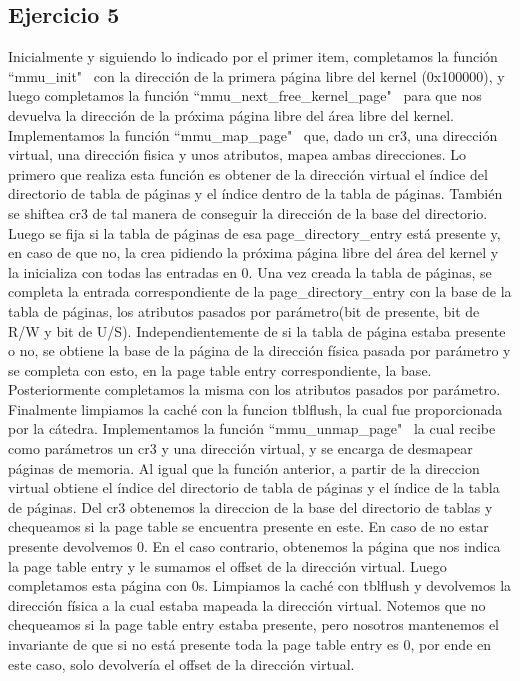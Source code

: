 \documentclass[a4paper]{article}
\begin{document}
\subsection{Ejercicio 5}
\justify
Inicialmente y siguiendo lo indicado por el primer item, completamos la función ``mmu_init" \ con la dirección de la primera página libre del kernel (0x100000), y luego completamos la función ``mmu_next_free_kernel_page" \ para que nos devuelva la dirección de la próxima página libre del área libre del kernel.
\justify
Implementamos la función ``mmu_map_page" \ que, dado un cr3, una dirección virtual, una dirección fisica y unos atributos, mapea ambas direcciones. Lo primero que realiza esta función es obtener de la dirección virtual el índice del directorio de tabla de páginas y el índice dentro de la tabla de páginas. También se shiftea cr3 de tal manera de conseguir la dirección de la base del directorio. Luego se fija si la tabla de páginas de esa page_directory_entry está presente y, en caso de que no, la crea pidiendo la próxima página libre del área del kernel y la inicializa con todas las entradas en 0. Una vez creada la tabla de páginas, se completa la entrada correspondiente de la page_directory_entry con la base de la tabla de páginas, los atributos pasados por parámetro(bit de presente, bit de R/W y bit de U/S). Independientemente de si la tabla de página estaba presente o no, se obtiene la base de la página de la dirección física pasada por parámetro y se completa con esto, en la page table entry correspondiente, la base. Posteriormente completamos la misma con los atributos pasados por parámetro.
\justify
Finalmente limpiamos la caché con la funcion tblflush, la cual fue proporcionada por la cátedra.
\justify
Implementamos la función ``mmu_unmap_page" \, la cual recibe como parámetros un cr3 y una dirección virtual, y se encarga de desmapear páginas de memoria. Al igual que la función anterior, a partir de la direccion virtual obtiene el índice del directorio de tabla de páginas y el índice de la tabla de páginas. Del cr3 obtenemos la direccion de la base del directorio de tablas y chequeamos si la page table se encuentra presente en este. En caso de no estar presente devolvemos 0. En el caso contrario, obtenemos la página que nos indica la page table entry y le sumamos el offset de la dirección virtual. Luego completamos esta página con 0s. Limpiamos la caché con tblflush y devolvemos la dirección física a la cual estaba mapeada la dirección virtual.
\justify
Notemos que no chequeamos si la page table entry estaba presente, pero nosotros mantenemos el invariante de que si no está presente toda la page table entry es 0, por ende en este caso, solo devolvería el offset de la dirección virtual.
\end{document}
